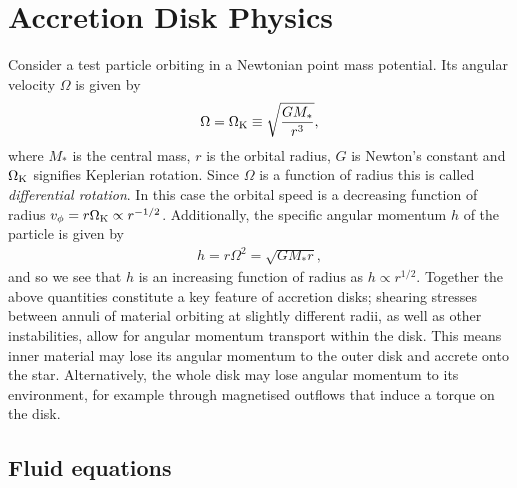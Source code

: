 \section{Accretion Disk Physics}


Consider a test particle orbiting in a Newtonian point mass potential. Its angular velocity $\Omega$ is given by
\begin{align}
    \Omega = \Omega_{\rm K} \equiv \sqrt{\frac{G M_*}{r^3}}, \label{eq:point_pot}
\end{align}
where $M_*$ is the central mass, $r$ is the orbital radius, $G$ is Newton's constant and $\Omega_{\rm K}$ signifies Keplerian rotation. 
Since $\Omega$ is a function of radius this is called \textit{differential rotation}.
In this case the orbital speed is a decreasing function of radius $v_\phi = r \Omega_{\rm K} \propto r^{-1/2}$.
Additionally, the specific angular momentum $h$ of the particle is given by
\begin{align}
    h = r \Omega^2 = \sqrt{G M_* r}, \label{eq:ang_mom}
\end{align}
and so we see that $h$ is an increasing function of radius as $h \propto r^{1/2}$.
Together the above quantities constitute a key feature of accretion disks; shearing stresses between annuli of material orbiting at slightly different radii, as well as other instabilities, allow for angular momentum transport within the disk. 
This means inner material may lose its angular momentum to the outer disk and accrete onto the star. 
Alternatively, the whole disk may lose angular momentum to its environment, for example through magnetised outflows that induce a torque on the disk.

\subsection{Fluid equations} \label{sec:fluid_eqns}

